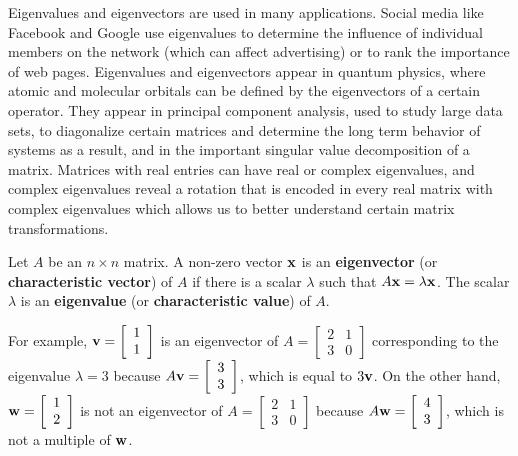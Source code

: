 Eigenvalues and eigenvectors are used in many applications. Social media like Facebook and Google use eigenvalues to determine the influence of individual members on the network (which can affect advertising) or to rank the importance of web pages. Eigenvalues and eigenvectors appear in quantum physics, where atomic and molecular orbitals can be defined by the eigenvectors of a certain operator. They appear in principal component analysis, used to study large data sets, to diagonalize certain matrices and determine the long term behavior of systems as a result, and in the important singular value decomposition of a matrix. Matrices with real entries can have real or complex eigenvalues, and complex eigenvalues reveal a rotation that is encoded in every real matrix with complex eigenvalues which allows us to better understand certain matrix transformations. 

\begin{definition} \label{def:eigenvector} Let $A$ be an $n \times n$ matrix. A non-zero vector $\mathbf{x}$ is an \textbf{eigenvector} (or \textbf{characteristic vector}) of $A$ if there is a scalar $\lambda$ such that
$A\mathbf{x} = \lambda \mathbf{x}$.
The scalar $\lambda$ is an \textbf{eigenvalue} (or \textbf{characteristic value}) of $A$.
\end{definition}

For example, $\mathbf{v}= \left[ \begin{array}{c} 1\\1\end{array} \right]$ is an eigenvector of $A=\left[ \begin{array}{cc} 2 & 1 \\ 3 & 0 \end{array} \right]$ corresponding to the eigenvalue $\lambda=3$ because $A\mathbf{v} = \left[ \begin{array}{c} 3\\3\end{array} \right]$, which is equal to $3\mathbf{v}$. On the other hand, $\mathbf{w}= \left[ \begin{array}{c} 1\\2\end{array} \right]$ is not an eigenvector of $A=\left[ \begin{array}{cc} 2 & 1 \\ 3 & 0 \end{array} \right]$ because $A\mathbf{w} = \left[ \begin{array}{c} 4\\3\end{array} \right]$, which is not a multiple of $\mathbf{w}$.




